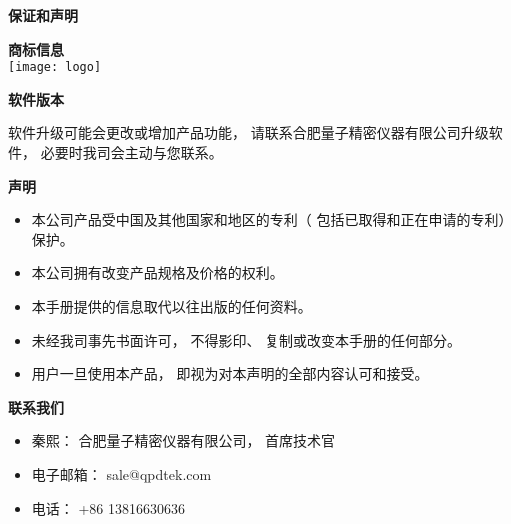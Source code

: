 \newpage
\pagestyle{fancy}
\renewcommand{\headrulewidth}{2.4pt}
\renewcommand{\footrulewidth}{2.4pt}
\chead{}
\cfoot{}
\fancyfoot[RO,LE]{\xiaosi\textbf{\thepage}}



\xiaoer \textbf{保证和声明}
\vspace{0.7cm}

\xiaosi \textbf{商标信息}\\
\hspace*{0.8cm}
\hspace{-10.0cm}\texttt{[image: logo]}

\vspace{0.5cm}
\xiaosi\textbf{软件版本}

\song 软件升级可能会更改或增加产品功能， 请联系合肥量子精密仪器有限公司升级软件， 必要时我司会主动与您联系。

\vspace{0.5cm}
\xiaosi\textbf{声明}
\song
\begin{itemize}
 \item 本公司产品受中国及其他国家和地区的专利（ 包括已取得和正在申请的专利）保护。
 \item 本公司拥有改变产品规格及价格的权利。
 \item 本手册提供的信息取代以往出版的任何资料。
 \item 未经我司事先书面许可， 不得影印、 复制或改变本手册的任何部分。
 \item 用户一旦使用本产品， 即视为对本声明的全部内容认可和接受。
\end{itemize}

\vspace{0.5cm}

\xiaosi\textbf{联系我们}
\song
\begin{itemize}
 \item 秦熙： 合肥量子精密仪器有限公司， 首席技术官
 \item 电子邮箱： sale@qpdtek.com
 \item 电话： +86 13816630636
\end{itemize}

